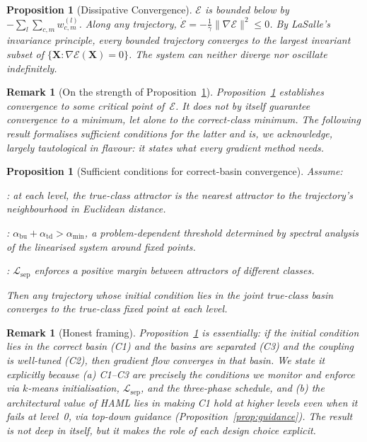 \documentclass[11pt,a4paper]{article}
\newtheorem{proposition}[theorem]{Proposition}
\newtheorem{remark}[theorem]{Remark}
\begin{document}
\begin{proposition}[Dissipative Convergence]
\label{prop:convergence}
$\mathcal{E}$ is bounded below by $-\sum_l \sum_{c,m} w^{(l)}_{c,m}$. Along any trajectory,
$\dot{\mathcal{E}} = -\frac{1}{\gamma}\|\nabla \mathcal{E}\|^2 \le 0$.
By LaSalle's invariance principle, every bounded trajectory converges to the largest
invariant subset of $\{\mathbf{X} : \nabla \mathcal{E}(\mathbf{X}) = 0\}$. The system can
neither diverge nor oscillate indefinitely.
\end{proposition}

\begin{remark}[On the strength of Proposition~\ref{prop:convergence}]
Proposition~\ref{prop:convergence} establishes convergence to \emph{some} critical point
of~$\mathcal{E}$. It does not by itself guarantee convergence to a \emph{minimum},
let alone to the \emph{correct-class} minimum. The following result formalises sufficient
conditions for the latter and is, we acknowledge, largely tautological in flavour: it
states what every gradient method needs.
\end{remark}

\begin{proposition}[Sufficient conditions for correct-basin convergence]
\label{prop:correct_basin}
Assume:
\begin{description}[leftmargin=2.5em]
  \item[C1 -- Local dominance]: at each level, the true-class attractor is the nearest
        attractor to the trajectory's neighbourhood in Euclidean distance.
  \item[C2 -- Sufficient coupling]:
        $\alpha_{\mathrm{bu}} + \alpha_{\mathrm{td}} > \alpha_{\min}$,
        a problem-dependent threshold determined by spectral analysis of the linearised
        system around fixed points.
  \item[C3 -- Basin separation]: $\mathcal{L}_{\mathrm{sep}}$ enforces a positive margin
        between attractors of different classes.
\end{description}
Then any trajectory whose initial condition lies in the joint true-class basin converges
to the true-class fixed point at each level.
\end{proposition}

\begin{remark}[Honest framing]
Proposition~\ref{prop:correct_basin} is essentially: \emph{if} the initial condition lies
in the correct basin (C1) \emph{and} the basins are separated (C3) \emph{and} the coupling
is well-tuned (C2), \emph{then} gradient flow converges in that basin. We state it
explicitly because (a) C1--C3 are precisely the conditions we monitor and enforce via
$k$-means initialisation, $\mathcal{L}_{\mathrm{sep}}$, and the three-phase schedule, and
(b) the architectural value of HAML lies in making C1 hold at \emph{higher} levels even
when it fails at level~0, via top-down guidance (Proposition~\ref{prop:guidance}). The
result is not deep in itself, but it makes the role of each design choice explicit.
\end{remark}
\end{document}
